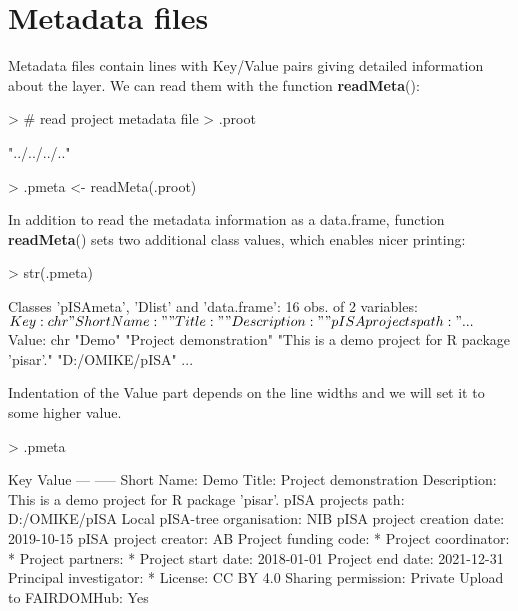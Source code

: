 \documentclass[a4paper,12pt]{article}\usepackage[]{graphicx}\usepackage[]{color}
\makeatletter
\providecommand\code{\bgroup\@codex}
\def\@codex#1{{\normalfont\ttfamily\hyphenchar\font=-1  #1}\egroup}
\providecommand{\fct}[1]{{\ttfamily\textbf{#1}()}}
\makeatother
\begin{document}
\section{Metadata files}

Metadata files contain lines with Key/Value pairs 
giving detailed information about the layer. We can read them with the function \fct{readMeta}:

\begin{Schunk}
\begin{Sinput}
> # read project metadata file
> .proot
\end{Sinput}
\begin{Soutput}
[1] "../../../.."
\end{Soutput}
\begin{Sinput}
> .pmeta <- readMeta(.proot)
\end{Sinput}
\end{Schunk}

In addition to read the metadata information as a \code{data.frame}, function
\fct{readMeta} sets two additional class values, which enables nicer printing:

\begin{Schunk}
\begin{Sinput}
> str(.pmeta)
\end{Sinput}
\begin{Soutput}
Classes 'pISAmeta', 'Dlist' and 'data.frame':	16 obs. of  2 variables:
 $ Key  : chr  "Short Name:" "Title:" "Description:" "pISA projects path:" ...
 $ Value: chr  "Demo" "Project demonstration" "This is a demo project for R package 'pisar'." "D:/OMIKE/pISA" ...
\end{Soutput}
\end{Schunk}

Indentation of the Value part depends on the line widths and we will set it to some higher value.

\begin{Schunk}
\begin{Sinput}
> .pmeta
\end{Sinput}
\begin{Soutput}
 Key                           Value
 ---                           -----
 Short Name:                   Demo
 Title:                        Project demonstration
 Description:                  This is a demo project for R package 'pisar'.
 pISA projects path:           D:/OMIKE/pISA
 Local pISA-tree organisation: NIB
 pISA project creation date:   2019-10-15
 pISA project creator:         AB
 Project funding code:         *
 Project coordinator:          *
 Project partners:             *
 Project start date:           2018-01-01
 Project end date:             2021-12-31
 Principal investigator:       *
 License:                      CC BY 4.0
 Sharing permission:           Private
 Upload to FAIRDOMHub:         Yes
\end{Soutput}
\end{Schunk}
\end{document}
